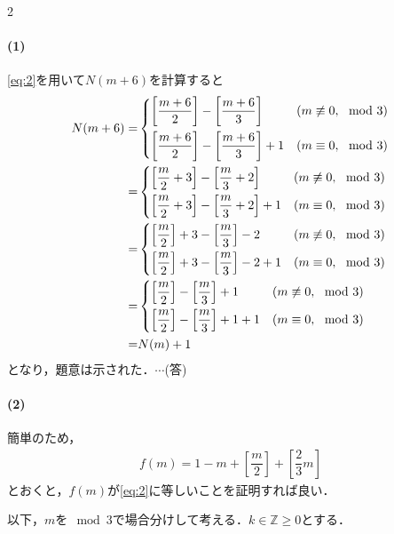 \documentclass[../../main.tex]{subfiles}
\begin{document}
\begin{multicols}{2}
  \paragraph{(1)}
  \cref{eq:2}を用いて$N(m+6)$を計算すると
  \begin{align}
    N(m+6) =
    &
    \begin{dcases}
      \left[\dfrac{m+6}{2}\right] - \left[\dfrac{m+6}{3}\right]     & (m \not\equiv 0, \mod 3) \\
      \left[\dfrac{m+6}{2}\right] - \left[\dfrac{m+6}{3}\right] + 1 & (m \equiv 0, \mod 3)
    \end{dcases}      \\
    = &
    \begin{dcases}
      \left[\dfrac{m}{2}+3\right] - \left[\dfrac{m}{3}+2\right]     & (m \not\equiv 0, \mod 3) \\
      \left[\dfrac{m}{2}+3\right] - \left[\dfrac{m}{3}+2\right] + 1 & (m \equiv 0, \mod 3)
    \end{dcases}  \\
    = &
    \begin{dcases}
      \left[\dfrac{m}{2}\right]+3 - \left[\dfrac{m}{3}\right]-2      & (m \not\equiv 0, \mod 3) \\
      \left[\dfrac{m}{2}\right]+3 - \left[\dfrac{m}{3}\right] -2 + 1 & (m \equiv 0, \mod 3)
    \end{dcases} \\
    = &
    \begin{dcases}
      \left[\dfrac{m}{2}\right] - \left[\dfrac{m}{3}\right] + 1    & (m \not\equiv 0, \mod 3) \\
      \left[\dfrac{m}{2}\right] - \left[\dfrac{m}{3}\right] +1 + 1 & (m \equiv 0, \mod 3)
    \end{dcases}   \\
    = & N(m) + 1
  \end{align}
  となり，題意は示された．$\cdots$(答)

  \paragraph{(2)}
  簡単のため，
  \begin{align}
    f(m) = 1-m+\left[\dfrac{m}{2}\right]+\left[\dfrac{2}{3}m\right]
  \end{align}
  とおくと，$f(m)$が\cref{eq:2}に等しいことを証明すれば良い．

  以下，$m$を$\mod 3$で場合分けして考える．$k\in\mathbb{Z} \ge 0$とする．


\end{multicols}
\end{document}

